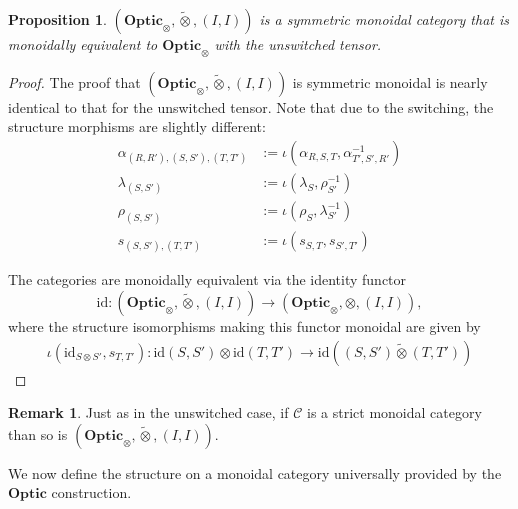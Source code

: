 \documentclass[11pt,letterpaper]{article}
\theoremstyle{plain}
\newtheorem{proposition}[theorem]{Proposition}
\theoremstyle{definition}
\newtheorem{remark}[theorem]{Remark}
\newcommand{\C}{\mathscr{C}}
\newcommand{\Optic}{\mathbf{Optic}}
\newcommand{\switched}{\mathbin{\tilde{\otimes}}}
\newcommand{\id}{\mathrm{id}}
\begin{document}
\begin{proposition}
  $(\Optic_\otimes, \switched, (I, I))$ is a symmetric monoidal category that is monoidally equivalent to $\Optic_\otimes$ with the unswitched tensor.
\end{proposition}
\begin{proof}
  The proof that $(\Optic_\otimes, \switched, (I, I))$ is symmetric monoidal is nearly identical to that for the unswitched tensor. Note that due to the switching, the structure morphisms are slightly different:
  \begin{align*}
    \alpha_{(R, R'), (S, S'), (T, T')} &:= \iota(\alpha_{R,S,T}, \alpha_{T',S',R'}^{-1}) \\
    \lambda_{(S, S')} &:= \iota(\lambda_{S}, \rho_{S'}^{-1}) \\
    \rho_{(S, S')} &:= \iota(\rho_{S}, \lambda_{S'}^{-1}) \\
    s_{(S, S'), (T, T')} &:= \iota(s_{S, T}, s_{S', T'})
  \end{align*}

  The categories are monoidally equivalent via the identity functor \[\id : (\Optic_\otimes, \switched, (I, I)) \to (\Optic_\otimes, \otimes, (I, I)),\] where the structure isomorphisms making this functor monoidal are given by
  \begin{align*}
    \iota(\id_{S \otimes S'}, s_{T, T'}) : \id(S, S') \otimes \id(T, T') \to \id((S, S') \switched (T, T'))
  \end{align*}
\end{proof}

\begin{remark}
  Just as in the unswitched case, if $\C$ is a strict monoidal category than so is $(\Optic_\otimes, \switched, (I, I))$.
\end{remark}

We now define the structure on a monoidal category universally provided by the $\Optic$ construction.
\end{document}
